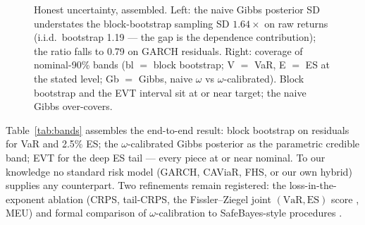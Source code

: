 \documentclass[11pt]{article}
\newcommand{\VaR}{\mathrm{VaR}}
\newcommand{\ES}{\mathrm{ES}}
\theoremstyle{remark}
\begin{document}
\begin{figure}[t]
\centering
{}\hfill
{}
\caption{Honest uncertainty, assembled. Left: the naive Gibbs posterior
SD understates the block-bootstrap sampling SD $1.64\times$ on raw
returns (i.i.d.\ bootstrap 1.19 --- the gap is the dependence
contribution); the ratio falls to 0.79 on GARCH residuals. Right:
coverage of nominal-90\% bands (bl $=$ block bootstrap; V $=$ VaR, E $=$
ES at the stated level; Gb $=$ Gibbs, naive $\omega$ vs
$\omega$-calibrated). Block bootstrap and the EVT interval sit at or
near target; the naive Gibbs over-covers.}
\label{fig:bands}
\end{figure}

Table~\ref{tab:bands} assembles the end-to-end result: block bootstrap
on residuals for VaR and 2.5\% ES; the $\omega$-calibrated Gibbs
posterior as the parametric credible band; EVT for the deep ES tail ---
every piece at or near nominal. To our knowledge no standard risk model
(GARCH, CAViaR, FHS, or our own hybrid) supplies any counterpart. Two
refinements remain registered: the loss-in-the-exponent ablation (CRPS,
tail-CRPS, the Fissler--Ziegel joint $(\VaR,\ES)$ score
\citep{fissler2016}, MEU) and formal comparison of $\omega$-calibration
to SafeBayes-style procedures \citep{grunwald2017safebayes}.
\end{document}
